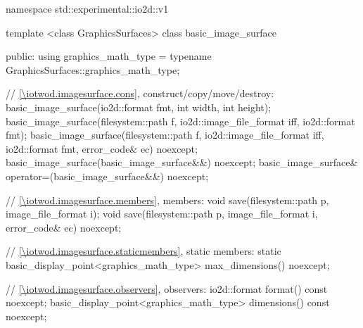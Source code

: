 \begin{codeblock}
namespace std::experimental::io2d::v1 {
  template <class GraphicsSurfaces>
  class basic_image_surface {
  public:
    using graphics_math_type = typename GraphicsSurfaces::graphics_math_type;

    // \ref{\iotwod.imagesurface.cons}, construct/copy/move/destroy:
    basic_image_surface(io2d::format fmt, int width, int height);
    basic_image_surface(filesystem::path f, io2d::image_file_format iff, io2d::format fmt);
    basic_image_surface(filesystem::path f, io2d::image_file_format iff, io2d::format fmt,
      error_code& ec) noexcept;
    basic_image_surface(basic_image_surface&&) noexcept;
    basic_image_surface& operator=(basic_image_surface&&) noexcept;

    // \ref{\iotwod.imagesurface.members}, members:
    void save(filesystem::path p, image_file_format i);
    void save(filesystem::path p, image_file_format i, error_code& ec) noexcept;

    // \ref{\iotwod.imagesurface.staticmembers}, static members:
    static basic_display_point<graphics_math_type> max_dimensions() noexcept;

    // \ref{\iotwod.imagesurface.observers}, observers:
    io2d::format format() const noexcept;
    basic_display_point<graphics_math_type> dimensions() const noexcept;
	
}}
\end{codeblock}
